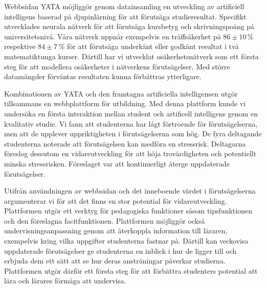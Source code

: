 Webbsidan YATA möjliggör genom datainsamling en utveckling av artificiell intelligens baserad på djupinlärning för att förutsäga studieresultat. Specifikt utvecklades neurala nätverk för att förutsäga kursbetyg och skrivningspoäng på universitetsnivå. Våra nätverk uppnår exempelvis en träffsäkerhet på $86\pm 10\,\%$ respektive $84\pm 7\,\%$ för att förutsäga underkänt eller godkänt resultat i två matematiktunga kurser. Därtill har vi utvecklat osäkerhetsnätverk som ett första steg för att modellera osäkerheter i nätverkens förutsägelser. Med större datamängder förväntas resultaten kunna förbättras ytterligare.

Kombinationen av YATA och den framtagna artificiella intelligensen utgör tillsammans en webbplattform för utbildning. Med denna plattform kunde vi undersöka en första interaktion mellan student och artificell intelligens genom en kvalitativ studie. Vi fann att studenterna har lågt förtroende för förutsägelserna, men att de upplever uppriktigheten i förutsägelserna som hög. De fyra deltagande studenterna noterade att förutsägelsen kan medföra en stressrisk. Deltagarna föreslog dessutom en vidareutveckling för att höja trovärdigheten och potentiellt minska stressrisken. Föreslaget var att kontinuerligt återge uppdaterade förutsägelser.

Utifrån användningen av webbsidan och det inneboende värdet i förutsägelserna argumenterar vi för att det finns en stor potential för vidareutveckling. Plattformen utgör ett verktyg för pedagogiska funktioner såsom tipsfunktionen och den föreslagna facitfunktionen. Plattformen möjliggör också undervisningsanpassning genom att återkoppla information till läraren, exempelvis kring vilka uppgifter studenterna fastnar på. Därtill kan veckovisa uppdaterade förutsägelser ge studenterna en inblick i hur de ligger till och erbjuda dem ett sätt att se hur deras ansträningar påverkar studierna. Plattformen utgör därför ett första steg för att förbättra studenters potential att lära och lärares förmåga att undervisa.
